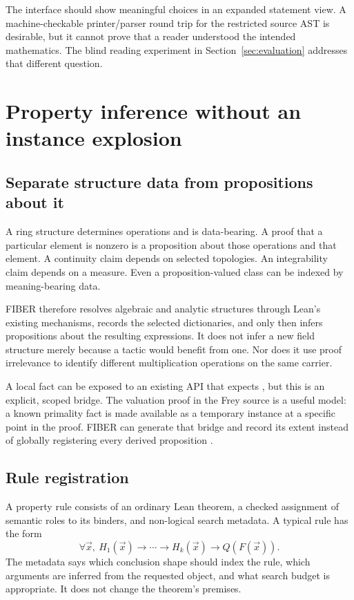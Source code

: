 \documentclass[11pt,letterpaper]{article}
\theoremstyle{definition}\newtheorem{definition}[theorem]{Definition}
\newcommand{\code}[1]{\texttt{\detokenize{#1}}}
\begin{document}
The interface should show meaningful choices in an expanded statement view. A machine-checkable printer/parser round trip for the restricted source AST is desirable, but it cannot prove that a reader understood the intended mathematics. The blind reading experiment in Section~\ref{sec:evaluation} addresses that different question.

\section{Property inference without an instance explosion}\label{sec:properties}
\subsection{Separate structure data from propositions about it}
A ring structure determines operations and is data-bearing. A proof that a particular element is nonzero is a proposition about those operations and that element. A continuity claim depends on selected topologies. An integrability claim depends on a measure. Even a proposition-valued class can be indexed by meaning-bearing data.

FIBER therefore resolves algebraic and analytic structures through Lean's existing mechanisms, records the selected dictionaries, and only then infers propositions about the resulting expressions. It does not infer a new field structure merely because a tactic would benefit from one. Nor does it use proof irrelevance to identify different multiplication operations on the same carrier.

A local fact can be exposed to an existing API that expects \code{Fact P}, but this is an explicit, scoped bridge. The valuation proof in the Frey source is a useful model: a known primality fact is made available as a temporary instance at a specific point in the proof. FIBER can generate that bridge and record its extent instead of globally registering every derived proposition \cite{freyMap}.

\subsection{Rule registration}
A property rule consists of an ordinary Lean theorem, a checked assignment of semantic roles to its binders, and non-logical search metadata. A typical rule has the form
\[
 \forall\vec x,\ H_1(\vec x)\to\cdots\to H_k(\vec x)
     \to Q(F(\vec x)).
\]
The metadata says which conclusion shape should index the rule, which arguments are inferred from the requested object, and what search budget is appropriate. It does not change the theorem's premises.
\end{document}
